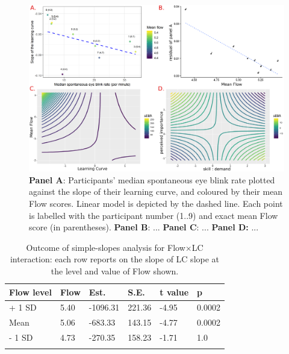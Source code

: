 \documentclass[10pt,letterpaper,floatsintext]{article}
\begin{document}
\begin{figure}[!t]
	\centering
	\includegraphics[width=\textwidth]{sEBR_RQ1-2_results}
	\caption{\textbf{Panel A}: Participants' median spontaneous eye blink rate plotted against the slope of their learning curve, and coloured by their mean Flow scores. Linear model is depicted by the dashed line. Each point is labelled with the participant number (1..9) and exact mean Flow score (in parentheses). \textbf{Panel B}: ... \textbf{Panel C}: ... \textbf{Panel D:} ...}
	\label{fig:EBRvLC}
\end{figure}



\begin{table}[!hb]
\centering
\caption{Outcome of simple-slopes analysis for Flow$\times$LC interaction: each row reports on the slope of LC slope at the level and value of Flow shown.}
\begin{tabular}{llllll}
\hline
Flow level & Flow & Est. & S.E. & t value & p \\
\hline
+ 1 SD & 5.40 & -1096.31 & 221.36 & -4.95 & 0.0002 \\
Mean   & 5.06 &  -683.33 & 143.15 & -4.77 & 0.0002 \\
- 1 SD & 4.73 &  -270.35 & 158.23 & -1.71 & 1.0 \\
\hline
\label{tab:simpslopes}
\end{tabular}
\end{table}
\end{document}
